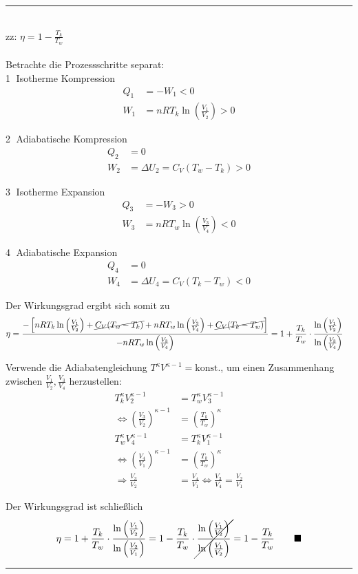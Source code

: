 \documentclass{article}
\newcommand{\lr}[1]{\left(#1\right)}
\newcommand{\lreck}[1]{\left[#1\right]}
\begin{document}
{\color{violet}
\hrule
	\\
	zz: $\eta = 1 - \frac{T_k}{T_w}$\\
	\\
	Betrachte die Prozessschritte separat:\\
	\textcircled{1} Isotherme Kompression
		\begin{align*}
			Q_1 &= - W_1 < 0 \\
			W_1 &= n R T_k \ln \lr{ \frac{V_1}{V_2} } > 0
		\end{align*}

	\textcircled{2} Adiabatische Kompression
		\begin{align*}
			Q_2 &= 0 \\
			W_2 &= \Delta U_2 = C_V (T_w - T_k) > 0
		\end{align*}
	
	\textcircled{3} Isotherme Expansion
		\begin{align*}
			Q_3 &= - W_3 > 0 \\
			W_3 &= n R T_w \ln \lr{ \frac{V_3}{V_4} } < 0
		\end{align*}
	
	\textcircled{4} Adiabatische Expansion
		\begin{align*}
			Q_4 &= 0 \\
			W_4 &= \Delta U_4 = C_V (T_k - T_w) < 0
		\end{align*}
	
	Der Wirkungsgrad ergibt sich somit zu
		\begin{align*}
			\eta &= \frac{- \lreck{ n R T_k \ln \lr{ \frac{V_1}{V_2} } + \cancel{ C_V (T_w - T_k) } + n R T_w \ln \lr{ \frac{V_3}{V_4} } + \cancel{ C_V (T_k - T_w) } } }{ -n R T_w \ln \lr{ \frac{V_3}{V_4} } } = 1 + \frac{T_k}{T_w} \cdot \frac{ \ln \lr{ \frac{V_1}{V_2} } }{ \ln \lr{ \frac{V_3}{V_4} } }
		\end{align*}
	
	Verwende die Adiabatengleichung $T^\kappa V^{\kappa-1} = \text{konst.}$, um einen Zusammenhang zwischen $\frac{V_1}{V_2}, \frac{V_3}{V_4}$ herzustellen:
		\begin{align*}
			T_k^\kappa V_2^{\kappa-1} &= T_w^\kappa V_3^{\kappa-1} \\
			\Leftrightarrow \lr{ \frac{V_3}{V_2} }^{\kappa-1} &= \lr{ \frac{T_k}{T_w} }^\kappa \\
			T_w^\kappa V_4^{\kappa-1} &= T_k^\kappa V_1^{\kappa-1} \\
			\Leftrightarrow \lr{ \frac{V_4}{V_1} }^{\kappa-1} &= \lr{ \frac{T_k}{T_w} }^\kappa \\
			\Rightarrow \frac{V_3}{V_2} &= \frac{V_4}{V_1} \Leftrightarrow \frac{V_3}{V_4} = \frac{V_2}{V_1}
		\end{align*}
	
	Der Wirkungsgrad ist schließlich
		\begin{align*}
			\eta = 1 + \frac{T_k}{T_w} \cdot \frac{ \ln\lr{ \frac{V_1}{V_2} } }{ \ln \lr{ \frac{V_2}{V_1} } } = 1 - \frac{T_k}{T_w} \cdot \cancel{ \frac{ \ln\lr{ \frac{V_1}{V_2} } }{ \ln \lr{ \frac{V_1}{V_2} } } } = 1 - \frac{T_k}{T_w} \qquad \blacksquare
		\end{align*}
\hrule
}
\end{document}
